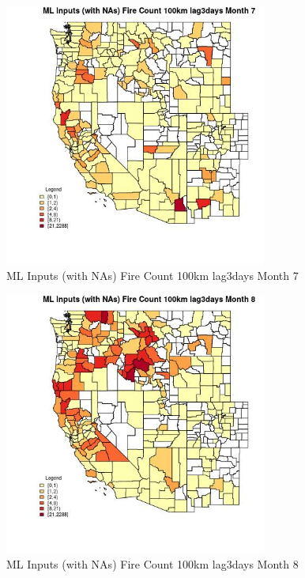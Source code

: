 \begin{figure} 
\centering  
\includegraphics[width=0.77\textwidth]{Code_Outputs/Report_ML_input_PM25_Step4_part_e_de_duplicated_aves_compiled_2019-05-21wNAs_CountyFire_Count_100km_lag3daysmedianMonth7.jpg} 
\caption{\label{fig:Report_ML_input_PM25_Step4_part_e_de_duplicated_aves_compiled_2019-05-21wNAsCountyFire_Count_100km_lag3daysmedianMonth7}ML Inputs (with NAs) Fire Count 100km lag3days Month 7} 
\end{figure} 
 

\begin{figure} 
\centering  
\includegraphics[width=0.77\textwidth]{Code_Outputs/Report_ML_input_PM25_Step4_part_e_de_duplicated_aves_compiled_2019-05-21wNAs_CountyFire_Count_100km_lag3daysmedianMonth8.jpg} 
\caption{\label{fig:Report_ML_input_PM25_Step4_part_e_de_duplicated_aves_compiled_2019-05-21wNAsCountyFire_Count_100km_lag3daysmedianMonth8}ML Inputs (with NAs) Fire Count 100km lag3days Month 8} 
\end{figure} 
 

